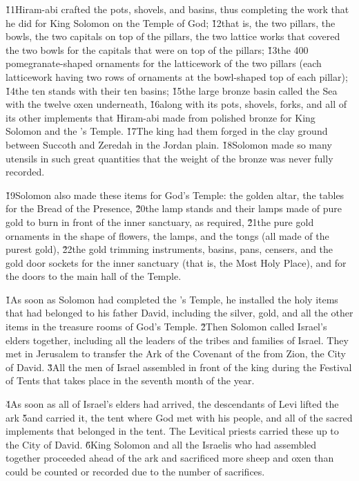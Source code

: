 \v{11}Hiram-abi crafted the pots, shovels, and basins, thus completing the work that he did for King Solomon on the Temple of God; \v{12}that is, the two pillars, the bowls, the two capitals on top of the pillars, the two lattice works that covered the two bowls for the capitals that were on top of the pillars; \v{13}the 400 pomegranate-shaped ornaments for the latticework of the two pillars (each latticework having two rows of ornaments at the bowl-shaped top of each pillar); \v{14}the ten stands with their ten basins; \v{15}the large bronze basin called the Sea with the twelve oxen underneath, \v{16}along with its pots, shovels, forks, and all of its other implements that Hiram-abi made from polished bronze for King Solomon and the 's Temple. \v{17}The king had them forged in the clay ground between Succoth and Zeredah in the Jordan plain. \v{18}Solomon made so many utensils in such great quantities that the weight of the bronze was never fully recorded.

\v{19}Solomon also made these items for God's Temple: the golden altar, the tables for the Bread of the Presence, \v{20}the lamp stands and their lamps made of pure gold to burn in front of the inner sanctuary, as required, \v{21}the pure gold ornaments in the shape of flowers, the lamps, and the tongs (all made of the purest gold), \v{22}the gold trimming instruments, basins, pans, censers, and the gold door sockets for the inner sanctuary (that is, the Most Holy Place), and for the doors to the main hall of the Temple.

\v{1}As soon as Solomon had completed the 's Temple, he installed the holy items that had belonged to his father David, including the silver, gold, and all the other items in the treasure rooms of God's Temple. \v{2}Then Solomon called Israel's elders together, including all the leaders of the tribes and families of Israel. They met in Jerusalem to transfer the Ark of the Covenant of the  from Zion, the City of David. \v{3}All the men of Israel assembled in front of the king during the Festival of Tents that takes place in the seventh month of the year.

\v{4}As soon as all of Israel's elders had arrived, the descendants of Levi lifted the ark \v{5}and carried it, the tent where God met with his people, and all of the sacred implements that belonged in the tent. The Levitical priests carried these up to the City of David. \v{6}King Solomon and all the Israelis who had assembled together proceeded ahead of the ark and sacrificed more sheep and oxen than could be counted or recorded due to the number of sacrifices.

